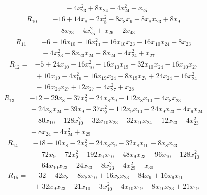 {\begin{align*}
&{}  - 4x_{23}^{2} + 8x_{24} - 4x_{24}^{2} + x_{25}
\end{align*}
\begin{align*}
R_{10} ={}& -16 + 14x_{8} - 2x_{8}^{2} - 8x_{8} x_{9} - 8x_{8} x_{23} + 8x_{9} \\
&{}  + 8x_{23} - 4x_{25}^{2} + x_{26} - 2x_{43}
\end{align*}
\begin{align*}
R_{11} ={}& -6 + 16x_{10} - 16x_{10}^{2} - 16x_{10} x_{23} - 16x_{10} x_{24} + 8x_{23} \\
&{}  - 4x_{23}^{2} - 8x_{23} x_{24} + 8x_{24} - 4x_{24}^{2} + x_{27}
\end{align*}
\begin{align*}
R_{12} ={}& -5 + 24x_{10} - 16x_{10}^{2} - 16x_{10} x_{19} - 32x_{10} x_{24} - 16x_{10} x_{27} \\
&{}  + 10x_{19} - 4x_{19}^{2} - 16x_{19} x_{24} - 8x_{19} x_{27} + 24x_{24} - 16x_{24}^{2} \\
&{}  - 16x_{24} x_{27} + 12x_{27} - 4x_{27}^{2} + x_{28}
\end{align*}
\begin{align*}
R_{13} ={}& -12 - 29x_{8} - 37x_{8}^{2} - 24x_{8} x_{9} - 112x_{8} x_{10} - 4x_{8} x_{23} \\
&{}  - 24x_{8} x_{24} - 39x_{9} - 37x_{9}^{2} - 112x_{9} x_{10} - 24x_{9} x_{23} - 4x_{9} x_{24} \\
&{}  - 80x_{10} - 128x_{10}^{2} - 32x_{10} x_{23} - 32x_{10} x_{24} - 12x_{23} - 4x_{23}^{2} \\
&{}  - 8x_{24} - 4x_{24}^{2} + x_{29}
\end{align*}
\begin{align*}
R_{14} ={}& -18 - 10x_{8} - 2x_{8}^{2} - 24x_{8} x_{9} - 32x_{8} x_{10} - 8x_{8} x_{23} \\
&{}  - 72x_{9} - 72x_{9}^{2} - 192x_{9} x_{10} - 48x_{9} x_{23} - 96x_{10} - 128x_{10}^{2} \\
&{}  - 64x_{10} x_{23} - 24x_{23} - 8x_{23}^{2} - 4x_{29}^{2} + x_{30}
\end{align*}
\begin{align*}
R_{15} ={}& -32 - 42x_{8} + 8x_{8} x_{10} + 16x_{8} x_{23} - 84x_{9} + 16x_{9} x_{10} \\
&{}  + 32x_{9} x_{23} + 21x_{10} - 3x_{10}^{2} - 4x_{10} x_{19} - 8x_{10} x_{23} + 21x_{19} \\

\end{align*}}
